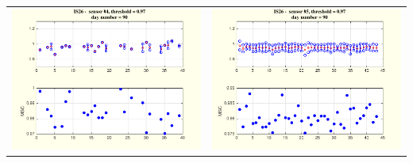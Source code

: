 \documentclass[handout,10pt]{beamer}
\newcommand{\figsstit}[2]{
\begin{figure}[hbtp]
\centerline{
    \hbox{ \epsfig{figure={#1}, scale=#2} }
}
\end{figure}}
\begin{document}
\begin{frame}
\begin{tabular}{cc}
\\
\includegraphics[scale=0.3]{evolutionon4atfreq1-eps-converted-to.pdf}
&
\includegraphics[scale=0.3]{evolutionon5atfreq1-eps-converted-to.pdf}
\end{tabular}
\end{frame}
%
\end{document}
